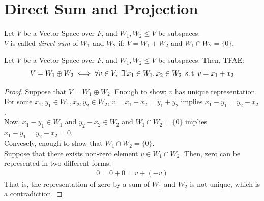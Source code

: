 \section{Direct Sum and Projection}
\begin{definition}
    Let $V$ be a Vector Space over $F$, and $W_1, W_2 \leq V$ be subspaces. \\
    $V$ is called \textit{direct sum} of $W_1$ and $W_2$ if:
    $V = W_1 + W_2$ and $W_1 \cap W_2 = \{0\}$.
\end{definition}

\begin{theorem}
    Let $V$ be a Vector Space over $F$, and $W_1, W_2 \leq V$ be subspaces. Then, TFAE:
    \begin{align*}
        V = W_1 \oplus W_2 \iff
        \forall v \in V,\
        \exists ! x_1 \in W_1, x_2 \in W_2 \ \operatorname{s.t} \ 
        v = x_1 + x_2
    \end{align*}
\end{theorem}
\begin{proof}
    Suppose that $V = W_1 \oplus W_2$. Enough to show: $v$ has unique representation. \\
    For some $x_1, y_1 \in W_1, x_2, y_2 \in W_2$, $v = x_1 + x_2 = y_1 + y_2$ implies
    $x_1 - y_1 = y_2 - x_2$. \\
    Now, $x_1 - y_1 \in W_1$ and $y_2 - x_2 \in W_2$ and $W_1 \cap W_2 = \{0\}$ implies $x_1 - y_1 = y_2 - x_2 = 0$. \\
    Convesely, enough to show that $W_1 \cap W_2 = \{0\}$. \\
    Suppose that there exists non-zero element $v \in W_1 \cap W_2$.
    Then, zero can be represented in two different forms:
    \begin{align*}
        0 = 0 + 0 = v + (-v)
    \end{align*}
    That is, the representation of zero by a sum of $W_1$ and $W_2$ is not unique, which is a contradiction.
\end{proof}

